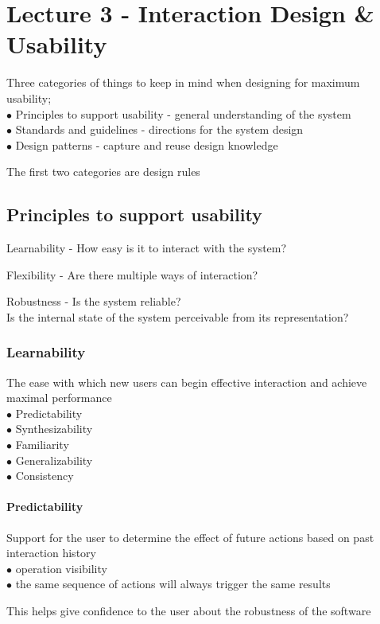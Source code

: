 \documentclass[]{project_plan}
\newcommand{\bulletPoint}{\hspace{-3.1pt}$\bullet$ \hspace{5pt}}
\begin{document}
\chapter{Lecture 3 - Interaction Design \& Usability}
Three categories of things to keep in mind when designing for maximum usability;\\
\bulletPoint Principles to support usability - general understanding of the system\\
\bulletPoint Standards and guidelines - directions for the system design\\
\bulletPoint Design patterns - capture and reuse design knowledge

The first two categories are design rules

\section{Principles to support usability}
Learnability - How easy is it to interact with the system?

Flexibility - Are there multiple ways of interaction?

Robustness - Is the system reliable?\\
Is the internal state of the system perceivable from its representation?

\subsection{Learnability}
The ease with which new users can begin effective interaction and achieve maximal
performance\\
\bulletPoint Predictability\\
\bulletPoint Synthesizability\\
\bulletPoint Familiarity\\
\bulletPoint Generalizability\\
\bulletPoint Consistency

\subsubsection{Predictability}
Support for the user to determine the effect of future actions based on past
interaction history\\
\bulletPoint operation visibility\\
\bulletPoint the same sequence of actions will always trigger the same results

This helps give confidence to the user about the robustness of the software
\end{document}
